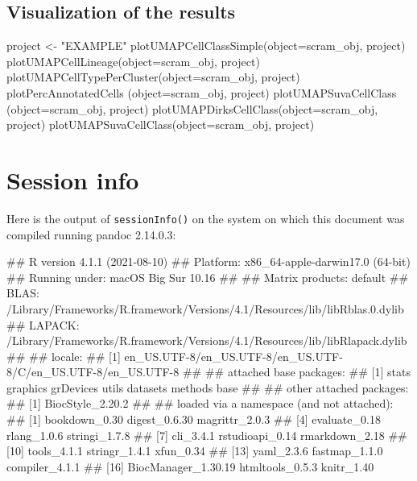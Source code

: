 \documentclass[]{article}
\newcommand{\hlstr}[1]{\textcolor[rgb]{0.251,0.627,0.251}{#1}}%
\newcommand{\hlstd}[1]{\textcolor[rgb]{0.251,0.251,0.251}{#1}}%
\newenvironment{Shaded}{\begin{myshaded}}{\end{myshaded}}
\renewenvironment{verbatim}{\color{codecolor}\begin{myshaded}\begin{oldverbatim}}{\end{oldverbatim}\end{myshaded}}
\newcommand{\StringTok}[1]{\hlstr{#1}}
\newcommand{\OtherTok}[1]{{#1}}
\newcommand{\FunctionTok}[1]{\hlstd{#1}}
\newcommand{\AttributeTok}[1]{{#1}}
\newcommand{\NormalTok}[1]{\hlstd{#1}}
\begin{document}
\hypertarget{visualization-of-the-results}{%
\subsection{Visualization of the results}\label{visualization-of-the-results}}

\begin{Shaded}
\begin{Highlighting}[]
\NormalTok{project }\OtherTok{\textless{}{-}} \StringTok{"EXAMPLE"}
\FunctionTok{plotUMAPCellClassSimple}\NormalTok{(}\AttributeTok{object=}\NormalTok{scram\_obj, project)}
\FunctionTok{plotUMAPCellLineage}\NormalTok{(}\AttributeTok{object=}\NormalTok{scram\_obj, project)}
\FunctionTok{plotUMAPCellTypePerCluster}\NormalTok{(}\AttributeTok{object=}\NormalTok{scram\_obj, project)}
\FunctionTok{plotPercAnnotatedCells}\NormalTok{ (}\AttributeTok{object=}\NormalTok{scram\_obj, project)}
\FunctionTok{plotUMAPSuvaCellClass}\NormalTok{ (}\AttributeTok{object=}\NormalTok{scram\_obj, project)}
\FunctionTok{plotUMAPDirksCellClass}\NormalTok{(}\AttributeTok{object=}\NormalTok{scram\_obj, project)}
\FunctionTok{plotUMAPSuvaCellClass}\NormalTok{(}\AttributeTok{object=}\NormalTok{scram\_obj, project)}
\end{Highlighting}
\end{Shaded}

\hypertarget{session-info}{%
\section*{Session info}\label{session-info}}

Here is the output of \texttt{sessionInfo()} on the system on which this document was
compiled running pandoc 2.14.0.3:

\begin{verbatim}
## R version 4.1.1 (2021-08-10)
## Platform: x86_64-apple-darwin17.0 (64-bit)
## Running under: macOS Big Sur 10.16
## 
## Matrix products: default
## BLAS:   /Library/Frameworks/R.framework/Versions/4.1/Resources/lib/libRblas.0.dylib
## LAPACK: /Library/Frameworks/R.framework/Versions/4.1/Resources/lib/libRlapack.dylib
## 
## locale:
## [1] en_US.UTF-8/en_US.UTF-8/en_US.UTF-8/C/en_US.UTF-8/en_US.UTF-8
## 
## attached base packages:
## [1] stats     graphics  grDevices utils     datasets  methods   base     
## 
## other attached packages:
## [1] BiocStyle_2.20.2
## 
## loaded via a namespace (and not attached):
##  [1] bookdown_0.30       digest_0.6.30       magrittr_2.0.3     
##  [4] evaluate_0.18       rlang_1.0.6         stringi_1.7.8      
##  [7] cli_3.4.1           rstudioapi_0.14     rmarkdown_2.18     
## [10] tools_4.1.1         stringr_1.4.1       xfun_0.34          
## [13] yaml_2.3.6          fastmap_1.1.0       compiler_4.1.1     
## [16] BiocManager_1.30.19 htmltools_0.5.3     knitr_1.40
\end{verbatim}
\end{document}
